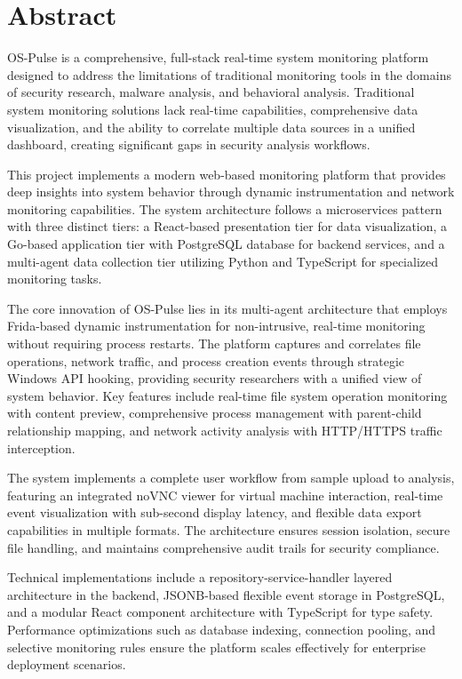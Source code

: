 \chapter*{Abstract}

\onehalfspacing

OS-Pulse is a comprehensive, full-stack real-time system monitoring platform designed to address the limitations of traditional monitoring tools in the domains of security research, malware analysis, and behavioral analysis. Traditional system monitoring solutions lack real-time capabilities, comprehensive data visualization, and the ability to correlate multiple data sources in a unified dashboard, creating significant gaps in security analysis workflows.

This project implements a modern web-based monitoring platform that provides deep insights into system behavior through dynamic instrumentation and network monitoring capabilities. The system architecture follows a microservices pattern with three distinct tiers: a React-based presentation tier for data visualization, a Go-based application tier with PostgreSQL database for backend services, and a multi-agent data collection tier utilizing Python and TypeScript for specialized monitoring tasks.

The core innovation of OS-Pulse lies in its multi-agent architecture that employs Frida-based dynamic instrumentation for non-intrusive, real-time monitoring without requiring process restarts. The platform captures and correlates file operations, network traffic, and process creation events through strategic Windows API hooking, providing security researchers with a unified view of system behavior. Key features include real-time file system operation monitoring with content preview, comprehensive process management with parent-child relationship mapping, and network activity analysis with HTTP/HTTPS traffic interception.

The system implements a complete user workflow from sample upload to analysis, featuring an integrated noVNC viewer for virtual machine interaction, real-time event visualization with sub-second display latency, and flexible data export capabilities in multiple formats. The architecture ensures session isolation, secure file handling, and maintains comprehensive audit trails for security compliance.

Technical implementations include a repository-service-handler layered architecture in the backend, JSONB-based flexible event storage in PostgreSQL, and a modular React component architecture with TypeScript for type safety. Performance optimizations such as database indexing, connection pooling, and selective monitoring rules ensure the platform scales effectively for enterprise deployment scenarios.

